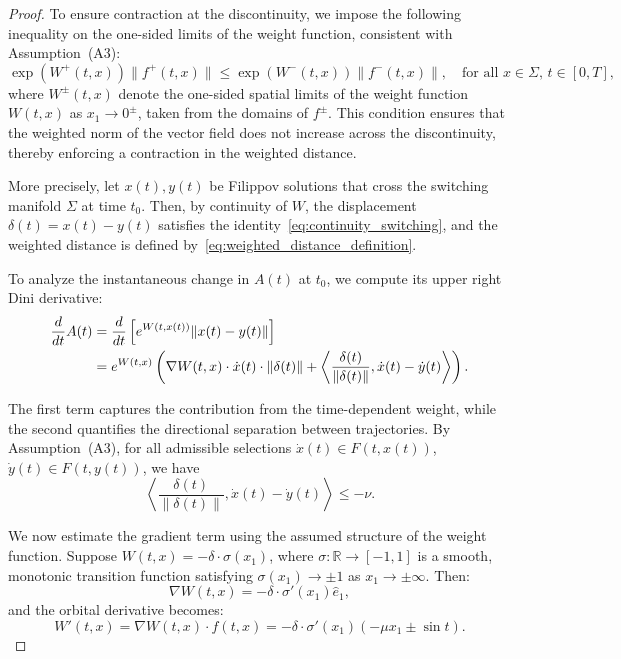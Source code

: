 \documentclass[11pt]{article}
\begin{document}
\begin{proof}
To ensure contraction at the discontinuity, we impose the following inequality on the one-sided limits of the weight function, consistent with Assumption~(A3):
\begin{equation} \label{eq:jump_contraction}
	\exp(W^+(t,x)) \|f^+(t,x)\| \le \exp(W^-(t,x)) \|f^-(t,x)\|, \quad \text{for all } x \in \Sigma,\, t \in [0,T],
\end{equation}
where \( W^\pm(t,x) \) denote the one-sided spatial limits of the weight function \( W(t,x) \) as \( x_1 \to 0^\pm \), taken from the domains of \( f^\pm \). This condition ensures that the weighted norm of the vector field does not increase across the discontinuity, thereby enforcing a contraction in the weighted distance.

More precisely, let \( x(t), y(t) \) be Filippov solutions that cross the switching manifold \( \Sigma \) at time \( t_0 \). Then, by continuity of \( W \), the displacement \( \delta(t) = x(t) - y(t) \) satisfies the identity~\eqref{eq:continuity_switching}, and the weighted distance is defined by~\eqref{eq:weighted_distance_definition}.

To analyze the instantaneous change in \( A(t) \) at \( t_0 \), we compute its upper right Dini derivative:
\begin{align}
	\frac{d}{dt} A(t) &= \frac{d}{dt} \left[ e^{W(t,x(t))} \|x(t) - y(t)\| \right] \notag \\
	&= e^{W(t,x)} \left( \nabla W(t,x) \cdot \dot{x}(t) \cdot \|\delta(t)\| + \left\langle \frac{\delta(t)}{\|\delta(t)\|}, \dot{x}(t) - \dot{y}(t) \right\rangle \right).
	\label{eq:derivative_weighted_distance}
\end{align}

The first term captures the contribution from the time-dependent weight, while the second quantifies the directional separation between trajectories. By Assumption~(A3), for all admissible selections \( \dot{x}(t) \in F(t,x(t)) \), \( \dot{y}(t) \in F(t,y(t)) \), we have
\begin{equation} \label{eq:directional_contraction}
	\left\langle \frac{\delta(t)}{\|\delta(t)\|}, \dot{x}(t) - \dot{y}(t) \right\rangle \le -\nu.
\end{equation}

We now estimate the gradient term using the assumed structure of the weight function. Suppose \( W(t,x) = -\delta \cdot \sigma(x_1) \), where \( \sigma: \mathbb{R} \to [-1,1] \) is a smooth, monotonic transition function satisfying \( \sigma(x_1) \to \pm 1 \) as \( x_1 \to \pm \infty \). Then:
\begin{equation} \label{eq:weight_gradient}
	\nabla W(t,x) = -\delta \cdot \sigma'(x_1) \hat{e}_1,
\end{equation}
and the orbital derivative becomes:
\begin{equation} \label{eq:orbital_derivative}
	W'(t,x) = \nabla W(t,x) \cdot f(t,x) = -\delta \cdot \sigma'(x_1)(-\mu x_1 \pm \sin t).
\end{equation}


\end{proof}
\end{document}
